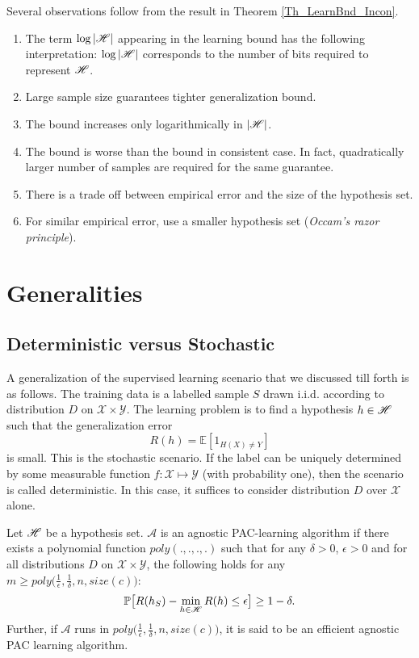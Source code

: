 \documentclass[a4paper,english,12pt]{article}
\begin{document}
\begin{rem}
Several observations follow from the result in Theorem \ref{Th_LearnBnd_Incon}. 
\begin{enumerate}
\item The term $\log |\mathscr{H}|$ appearing in the learning bound has the following  interpretation: $\log |\mathscr{H}|$ corresponds to the number of bits required to represent $\mathscr{H}$.
\item Large sample size guarantees tighter generalization bound.
\item The bound increases only logarithmically in $|\mathscr{H}|$.
\item The bound is worse than the bound in consistent case. In fact, quadratically larger number of samples are required for the same guarantee. 
\item There is a trade off between empirical error and the size of the hypothesis set.
\item For similar empirical error, use a smaller hypothesis set (\textit{Occam's razor principle}). 
\end{enumerate}
\end{rem}


\section{Generalities}

\subsection{Deterministic versus Stochastic}
A generalization of the supervised learning scenario that we discussed till forth is as follows. The training data is a labelled sample $S$ drawn i.i.d. according to distribution $D$ on $\mathcal{X}\times\mathcal{Y}.$ The learning problem is to find a hypothesis $h\in\mathscr{H}$ such that the generalization error $$R(h)=\mathbb{E}[1_{{H(X)\neq Y}}]$$ is small. This is the stochastic scenario. If the label can be uniquely determined by some measurable function $f:\mathcal{X}\mapsto \mathcal{Y}$ (with probability one), then the scenario is called deterministic. In this case, it suffices to consider distribution $D$ over $\mathcal{X}$ alone.

\begin{defn}
Let $\mathscr{H}$ be a hypothesis set. $\mathcal{A}$ is an agnostic PAC-learning algorithm if there exists a polynomial function $poly(.,.,.,.)$ such that for any $\delta>0$, $\epsilon>0$ and for all distributions $D$ on $\mathcal{X}\times \mathcal{Y}$, the following holds for any $m\geq poly\big(\frac{1}{\epsilon},\frac{1}{\delta},n,size(c)\big)$: $$\mathbb{P}\big[R(h_S)-\min\limits_{h\in\mathscr{H}}R(h)\leq \epsilon\big]\geq 1-\delta.$$Further, if $\mathcal{A}$ runs in $poly\big(\frac{1}{\epsilon},\frac{1}{\delta},n,size(c)\big)$, it is said to be an efficient agnostic PAC learning algorithm.
\end{defn}
\end{document}
